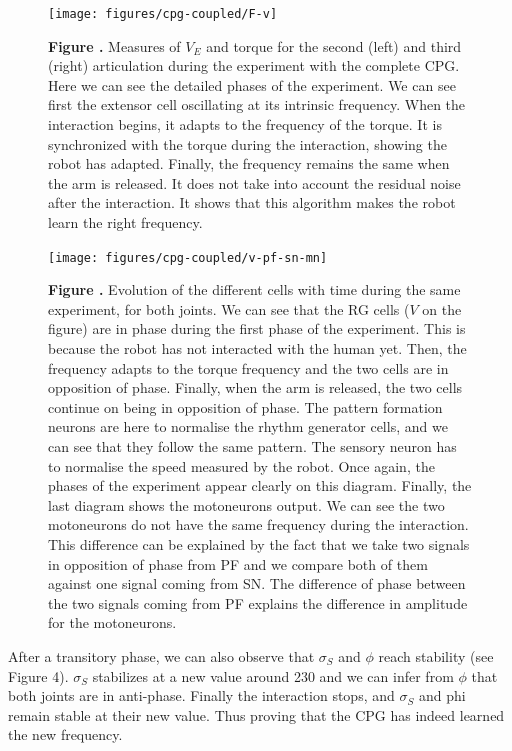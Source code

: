 \begin{figure}[h!]
\begin{center}
\texttt{[image: figures/cpg-coupled/F-v]}
\end{center}
\textbf{\label{fig:16} Figure .}{ Measures of $V_{E}$ and torque for the second (left) and third (right) articulation during the experiment with the complete CPG. Here we can see the detailed phases of the experiment. We can see first the extensor cell oscillating at its intrinsic frequency. When the interaction begins, it adapts to the frequency of the torque. It is synchronized with the torque during the interaction, showing the robot has adapted. Finally, the frequency remains the same when the arm is released. It does not take into account the residual noise after the interaction. It shows that this algorithm makes the robot learn the right frequency.}
\end{figure}

\begin{figure}[h!]
\begin{center}
\texttt{[image: figures/cpg-coupled/v-pf-sn-mn]}
\end{center}
\textbf{\label{fig:18} Figure .}{ Evolution of the different cells with time during the same experiment, for both joints. We can see that the RG cells ($V$ on the figure) are in phase during the first phase of the experiment. This is because the robot has not interacted with the human yet. Then, the frequency adapts to the torque frequency and the two cells are in opposition of phase. Finally, when the arm is released, the two cells continue on being in opposition of phase. The pattern formation neurons are here to normalise the rhythm generator cells, and we can see that they follow the same pattern. The sensory neuron has to normalise the speed measured by the robot. Once again, the phases of the experiment appear clearly on this diagram. Finally, the last diagram shows the motoneurons output. We can see the two motoneurons do not have the same frequency during the interaction. This difference can be explained by the fact that we take two signals in opposition of phase from PF and we compare both of them against one signal coming from SN. The difference of phase between the two signals coming from PF explains the difference in amplitude for the motoneurons.}
\end{figure}

After a transitory phase, we can also observe that $\sigma_S$ and $\phi$ reach stability (see Figure 4). $\sigma_S$ stabilizes at a new value around 230 and we can infer from $\phi$ that both joints are in anti-phase. Finally the interaction stops, and $\sigma_S$ and phi remain stable at their new value. Thus proving that the CPG has indeed learned the new frequency.


